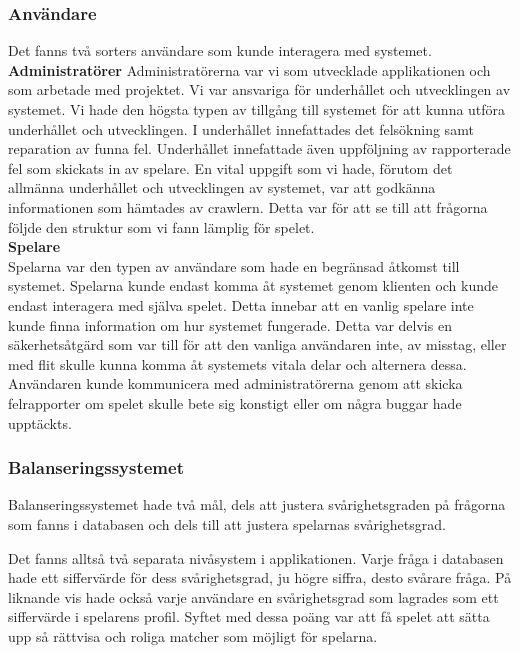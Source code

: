 \documentclass[a4paper, 11pt]{article}
\begin{document}
\subsubsection{Användare}
Det fanns två sorters användare som kunde interagera med systemet.\\
\newline
\textbf{Administratörer} \label{admins}
Administratörerna var vi som utvecklade applikationen och som arbetade med projektet. Vi var ansvariga för underhållet och utvecklingen av systemet. Vi hade den högsta typen av tillgång till systemet för att kunna utföra underhållet och utvecklingen. I underhållet innefattades det felsökning samt reparation av funna fel. Underhållet innefattade även uppföljning av rapporterade fel som skickats in av spelare. En vital uppgift som vi hade, förutom det allmänna underhållet och utvecklingen av systemet, var att godkänna informationen som hämtades av crawlern. Detta var för att se till att frågorna följde den struktur som vi fann lämplig för spelet.\\
\newline
\textbf{Spelare}\\
Spelarna var den typen av användare som hade en begränsad åtkomst till systemet. Spelarna kunde endast komma åt systemet genom klienten och kunde endast interagera med själva spelet. Detta innebar att en vanlig spelare inte kunde finna information om hur systemet fungerade. Detta var delvis en säkerhetsåtgärd som var till för att den vanliga användaren inte, av misstag, eller med flit skulle kunna komma åt systemets vitala delar och alternera dessa. Användaren kunde kommunicera med administratörerna genom att skicka felrapporter om spelet skulle bete sig konstigt eller om några buggar hade upptäckts.

\subsubsection{Balanseringssystemet} \label{balanseringssystemet}
Balanseringssystemet hade två mål, dels att justera svårighetsgraden på frågorna som fanns i databasen och dels till att justera spelarnas svårighetsgrad. 

Det fanns alltså två separata nivåsystem i applikationen. Varje fråga i databasen hade ett siffervärde för dess svårighetsgrad, ju högre siffra, desto svårare fråga. På liknande vis hade också varje användare en svårighetsgrad som lagrades som ett siffervärde i spelarens profil. Syftet med dessa poäng var att få spelet att sätta upp så rättvisa och roliga matcher som möjligt för spelarna. 
\end{document}

